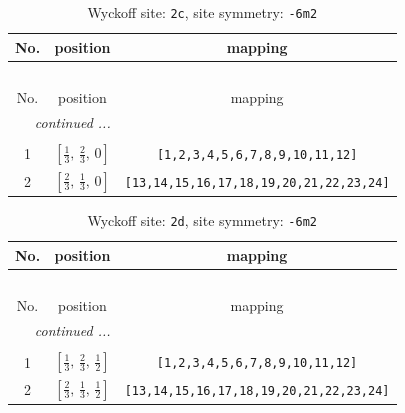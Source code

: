 \documentclass[fleqn,8pt]{jsarticle}
\begin{document}
\begin{longtable}{ccc}
\caption{Wyckoff site: {\tt 2c}, site symmetry: {\tt -6m2}}
 \\
 \hline \hline
No. & position & mapping \\ \hline \endfirsthead

\multicolumn{2}{l}{\tablename\ \thetable{}} \\
 \hline \hline
No. & position & mapping \\ \hline \endhead

 \hline \hline
\multicolumn{2}{r}{\footnotesize\it continued ...} \\ \endfoot

 \hline \hline
\multicolumn{2}{r}{} \\ \endlastfoot

1 & $\left[ \frac{1}{3},\, \frac{2}{3},\, 0 \right]$ & {\tt [1,2,3,4,5,6,7,8,9,10,11,12]} \\ \hline
2 & $\left[ \frac{2}{3},\, \frac{1}{3},\, 0 \right]$ & {\tt [13,14,15,16,17,18,19,20,21,22,23,24]} \\
\end{longtable}
\renewcommand{\arraystretch}{1.2}
\begin{longtable}{ccc}
\caption{Wyckoff site: {\tt 2d}, site symmetry: {\tt -6m2}}
 \\
 \hline \hline
No. & position & mapping \\ \hline \endfirsthead

\multicolumn{2}{l}{\tablename\ \thetable{}} \\
 \hline \hline
No. & position & mapping \\ \hline \endhead

 \hline \hline
\multicolumn{2}{r}{\footnotesize\it continued ...} \\ \endfoot

 \hline \hline
\multicolumn{2}{r}{} \\ \endlastfoot

1 & $\left[ \frac{1}{3},\, \frac{2}{3},\, \frac{1}{2} \right]$ & {\tt [1,2,3,4,5,6,7,8,9,10,11,12]} \\ \hline
2 & $\left[ \frac{2}{3},\, \frac{1}{3},\, \frac{1}{2} \right]$ & {\tt [13,14,15,16,17,18,19,20,21,22,23,24]} \\
\end{longtable}
\renewcommand{\arraystretch}{1.2}
\end{document}
